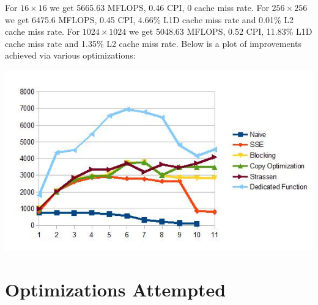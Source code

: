 \documentclass{article}
\begin{document}
For $16\times16$ we get 5665.63 MFLOPS, 0.46 CPI, 0 cache miss rate.  For $256\times256$ we get 6475.6 MFLOPS, 0.45 CPI, 4.66\% L1D cache miss rate and 0.01\% L2 cache miss rate.  For $1024\times1024$ we get 5048.63 MFLOPS, 0.52 CPI, 11.83\% L1D cache miss rate and 1.35\% L2 cache miss rate.  Below is a plot of improvements achieved via various optimizations:

\includegraphics[scale = 0.8]{Performance.jpg}


\section{Optimizations Attempted}
\end{document}
